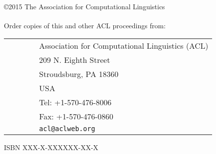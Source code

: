 \documentclass[11pt]{article}
\begin{document}
%
%

\vspace*{3.5in}
\large
\noindent
\copyright 2015 The Association for Computational Linguistics\\
\hspace*{6.5mm} \\

\vspace*{0.6in}
\noindent Order copies of this and other ACL proceedings from: \\
\vspace*{3mm}

\begin{tabular}{ll}
\ \ \ \ \ \ & Association for Computational Linguistics (ACL) \\
& 209 N. Eighth Street \\
& Stroudsburg, PA 18360 \\
& USA \\
& Tel: +1-570-476-8006 \\
& Fax: +1-570-476-0860 \\
& {\tt acl@aclweb.org} \\
\end{tabular}

\vspace*{6mm}
\noindent ISBN XXX-X-XXXXXX-XX-X\\
\end{document}
